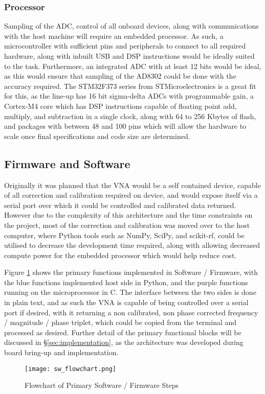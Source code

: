 \subsubsection{Processor}
Sampling of the ADC, control of all onboard devices, along with communications with the host machine will require an embedded processor. As such, a microcontroller with sufficient pins and peripherals to connect to all required hardware, along with inbuilt USB and DSP instructions would be ideally suited to the task. Furthermore, an integrated ADC with at least 12 bits would be ideal, as this would ensure that sampling of the AD8302 could be done with the accuracy required. The STM32F373 series from STMicroelectronics is a great fit for this, as the line-up has 16 bit sigma-delta ADCs with programmable gain, a Cortex-M4 core which has DSP instructions capable of floating point add, multiply, and subtraction in a single clock, along with 64 to 256 Kbytes of flash, and packages with between 48 and 100 pins which will allow the hardware to scale once final specifications and code size are determined. 

\subsection{Firmware and Software}
\label{subsec:firmware_software}
Originally it was planned that the VNA would be a self contained device, capable of all correction and calibration required on device, and would expose itself via a serial port over which it could be controlled and calibrated data returned. However due to the complexity of this architecture and the time constraints on the project, most of the correction and calibration was moved over to the host computer, where Python tools such as NumPy, SciPy, and scikit-rf, could be utilised to decrease the development time required, along with allowing decreased compute power for the embedded processor which would help reduce cost. 

Figure \ref{fig:sw_flowchart} shows the primary functions implemented in Software / Firmware, with the blue functions implemented host side in Python, and the purple functions running on the microprocessor in C. The interface between the two sides is done in plain text, and as such the VNA is capable of being controlled over a serial port if desired, with it returning a non calibrated, non phase corrected frequency / magnitude / phase triplet, which could be copied from the terminal and processed as desired. Further detail of the primary functional blocks will be discussed in \S \ref{sec:implementation}, as the architecture was developed during board bring-up and implementation. 

\begin{landscape}
	\begin{figure}[H]
		\centering
		\texttt{[image: sw\_flowchart.png]}
		\caption{Flowchart of Primary Software / Firmware Steps}
		\label{fig:sw_flowchart}
	\end{figure}
\end{landscape}